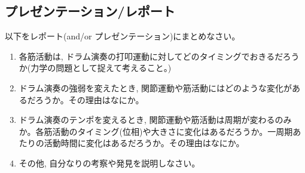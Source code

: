 \documentclass{ltjsarticle}
\begin{document}
\subsection{プレゼンテーション/レポート}

以下をレポート(and/or プレゼンテーション)にまとめなさい。
\begin{enumerate}
  \item 各筋活動は, ドラム演奏の打叩運動に対してどのタイミングでおきるだろうか(力学の問題として捉えて考えること。)
  \item ドラム演奏の強弱を変えたとき, 関節運動や筋活動にはどのような変化があるだろうか。その理由はなにか。
  \item ドラム演奏のテンポを変えるとき,  関節運動や筋活動は周期が変わるのみか。各筋活動のタイミング(位相)や大きさに変化はあるだろうか。一周期あたりの活動時間に変化はあるだろうか。その理由はなにか。
  \item その他, 自分なりの考察や発見を説明しなさい。
\end{enumerate}
\end{document}
